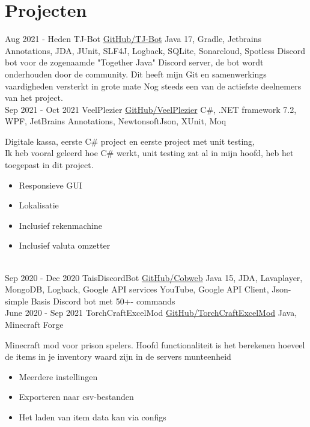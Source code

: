 \documentclass[letterpaper]{twentysecondcv} %
\begin{document}
    \section{Projecten}
    \begin{twenty} %
        \twentyitem
        {Aug 2021 -}
        {Heden}
        {TJ-Bot}
        {\href{https://github.com/Together-Java/TJ-Bot/}{GitHub/TJ-Bot}}
        {Java 17, Gradle, Jetbrains Annotations, JDA, JUnit, SLF4J, Logback, SQLite, Sonarcloud, Spotless}
        {Discord bot voor de zogenaamde "Together Java" Discord server, de bot wordt onderhouden door de community.
        Dit heeft mijn Git en samenwerkings vaardigheden versterkt in grote mate
        Nog steeds een van de actiefste deelnemers van het project.
        }\\
        \twentyitem
        {Sep 2021 -}
        {Oct 2021}
        {VeelPlezier}
        {\href{https://github.com/Tais993/VeelPlezier}{GitHub/VeelPlezier}}
        {C\#, .NET framework 7.2, WPF, JetBrains Annotations, NewtonsoftJson, XUnit, Moq}
        {
            Digitale kassa, eerste C\# project en eerste project met unit testing, \\

        Ik heb vooral geleerd hoe C\# werkt, unit testing zat al in mijn hoofd, heb het  toegepast in dit project.
            \begin{itemize}
                \item Responsieve GUI
                \item Lokalisatie
                \item Inclusief rekenmachine
                \item Inclusief valuta omzetter
            \end{itemize}}\\
        \twentyitem
        {Sep 2020 -}
        {Dec 2020}
        {TaisDiscordBot}
        {\href{https://github.com/Tais993/taisdiscordbot}{GitHub/Cobweb}}
        {Java 15, JDA, Lavaplayer, MongoDB, Logback, Google API services YouTube, Google API Client, Json-simple}
        {Basis Discord bot met 50+- commands}\\
        \twentyitem
        {June 2020 -}
        {Sep 2021}
        {TorchCraftExcelMod}
        {\href{https://github.com/Tais993/TorchCraftExcelMod}{GitHub/TorchCraftExcelMod}}
        {Java, Minecraft Forge}
        {
            Minecraft mod voor prison spelers.
            Hoofd functionaliteit is het berekenen hoeveel de items in je inventory waard zijn in de servers munteenheid
            \begin{itemize}
                \item Meerdere instellingen
                \item Exporteren naar csv-bestanden
                \item Het laden van item data kan via configs
            \end{itemize}}\\
    \end{twenty}
\end{document}
